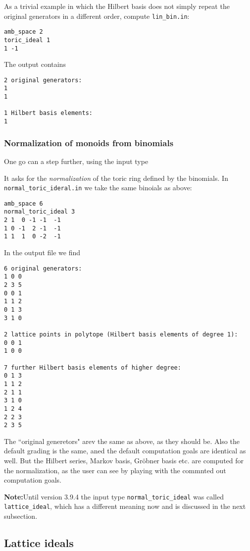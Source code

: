 As a trivial example in which the Hilbert basis does not simply repeat the original generators in a different order, compute \verb|lin_bin.in|:
\begin{Verbatim}
amb_space 2
toric_ideal 1
1 -1
\end{Verbatim}
The output contains
\begin{Verbatim}
2 original generators:
1
1

1 Hilbert basis elements:
1
\end{Verbatim}

\subsubsection{Normalization of monoids from binomials}\label{normal_toric_ideal}

One go can a step further, using the input type
\begin{itemize}
\end{itemize}
It asks for the \emph{normalization} of the toric ring defined by the binomials. In \verb|normal_toric_ideral.in| we take the same binoials as above:
\begin{Verbatim}
amb_space 6
normal_toric_ideal 3
2 1  0 -1 -1  -1
1 0 -1  2 -1  -1
1 1  1  0 -2  -1
\end{Verbatim}
In the output file we find
\begin{Verbatim}
6 original generators:
1 0 0
2 3 5
0 0 1
1 1 2
0 1 3
3 1 0

2 lattice points in polytope (Hilbert basis elements of degree 1):
0 0 1
1 0 0

7 further Hilbert basis elements of higher degree:
0 1 3
1 1 2
2 1 1
3 1 0
1 2 4
2 2 3
2 3 5
\end{Verbatim}
The ``original generetors" arev the same as above, as they should be. Also the default grading is the same, aned the default computation goals are identical as well. But the Hilbert series, Markov basis, Gröbner basis etc. are computed for the normalization, as the user can see by playing with the commnted out computation goals.

\textbf{Note:}\enspace Until version 3.9.4 the input type \verb|normal_toric_ideal| was called \verb|lattice_ideal|, which has a different meaning now and is discussed in the next subsection.

\subsection{Lattice ideals}\label{lattice_ideal}

